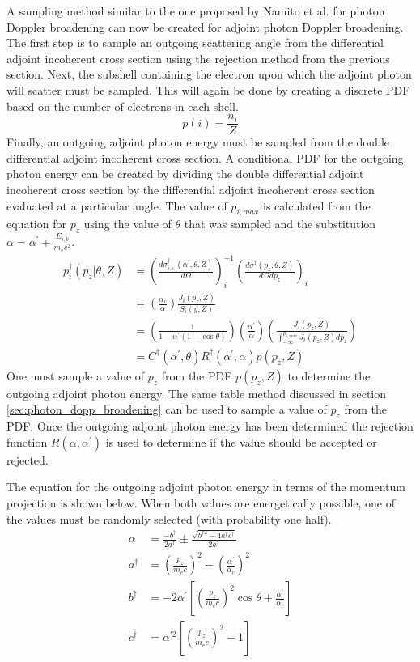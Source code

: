 A sampling method similar to the one proposed by Namito et al. for photon 
Doppler broadening can now be created for adjoint photon Doppler broadening. 
The first step is to sample an outgoing scattering angle from the differential
adjoint incoherent cross section using the rejection method from the 
previous section. Next, the subshell containing the electron upon which the
adjoint photon will scatter must be sampled. This will again be done by
creating a discrete PDF based on the number of electrons in each shell.
\begin{equation*}
  p(i) = \frac{n_i}{Z}
\end{equation*}
Finally, an outgoing adjoint photon energy must be sampled from the double
differential adjoint incoherent cross section. A conditional PDF for the 
outgoing photon energy can be created by dividing the double differential
adjoint incoherent cross section by the differential adjoint incoherent cross
section evaluated at a particular angle. The value of $p_{i,max}$ is 
calculated from the equation for $p_z$ using the value of $\theta$ that was 
sampled and the substitution $\alpha = \alpha^{'} + \frac{E_{i,b}}{m_ec^2}$.
\begin{align}
  p_i^{\dagger}(p_z|\theta,Z) & = 
  \left(\frac{d\sigma_{i.s.}^{\dagger}(\alpha^{'},\theta,Z)}{d\Omega}\right)_i^{-1}
  \left(\frac{d\sigma^{\dagger}(p_z,\theta,Z)}{d\Omega dp_z} \right)_i \nonumber\\
  & = \left(\frac{\alpha_c}{\alpha}\right)\frac{J_i(p_z,Z)}{S_i(y,Z)}
  \nonumber \\
  & = \left(\frac{1}{1-\alpha^{'}(1-\cos{\theta})}\right)
  \left(\frac{\alpha^{'}}{\alpha}\right) 
  \left(\frac{J_i(p_z,Z)}{\int_{-\infty}^{p_{i,max}}J_i(p_z,Z) dp_z}\right)
  \nonumber \\
  & = C^{\dagger}(\alpha^{'},\theta)R^{\dagger}(\alpha^{'},\alpha)p(p_z,Z)
\end{align}
One must sample a value of $p_z$ from the PDF $p(p_z,Z)$ to determine the
outgoing adjoint photon energy. The same table method discussed in section
\ref{sec:photon_dopp_broadening} can be used to sample a value of $p_z$ from
the PDF. Once the outgoing adjoint photon energy has been determined the 
rejection function $R(\alpha,\alpha^{'})$ is used to determine if the value 
should be accepted or rejected. 

The equation for the outgoing adjoint photon energy in terms of the momentum
projection is shown below. When both values are energetically possible, one of
the values must be randomly selected (with probability one half).
\begin{align}
  \alpha &= \frac{-b^{\dagger}}{2a^{\dagger}} \pm 
  \frac{\sqrt{b^{\dagger 2} - 4a^{\dagger}c^{\dagger}}}{2a^{\dagger}} \\
  a^{\dagger} & = \left(\frac{p_z}{m_ec}\right)^2 - 
  \left(\frac{\alpha^{'}}{\alpha_c}\right)^2
  \nonumber \\
  b^{\dagger} & = -2\alpha^{'}\left[\left(\frac{p_z}{m_ec}\right)^2\cos{\theta} + 
  \frac{\alpha^{'}}{\alpha_c}\right] \nonumber \\
  c^{\dagger} & = \alpha^{'2}\left[\left(\frac{p_z}{m_ec}\right)^2 - 1\right] 
  \nonumber
\end{align}

